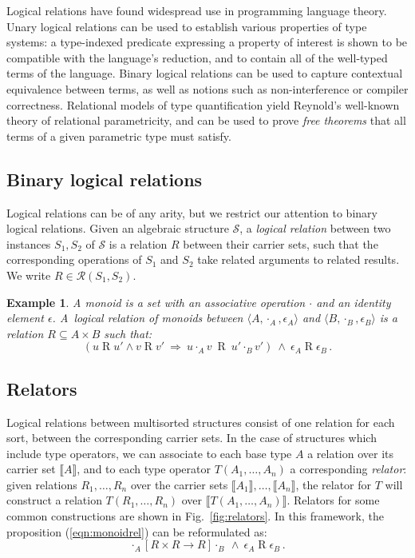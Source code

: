 \documentclass[draft,11pt]{report}
\newtheorem{example}{Example}
\newcommand{\ifr}[1]{\mathrel{[{#1}]}}
\begin{document}
Logical relations have found widespread use in programming language theory.
Unary logical relations can be used to establish
various properties of type systems:
a type-indexed predicate expressing a property of interest
is shown to be compatible with the language's reduction,
and to contain all of the well-typed terms of the language.
Binary logical relations can be used to capture
contextual equivalence between terms,
as well as notions such as non-interference or compiler correctness.
Relational models of type quantification yield
Reynold's well-known theory of relational parametricity,
and can be used to prove \emph{free theorems} that
all terms of a given parametric type must satisfy.

\subsection{Binary logical relations}

Logical relations can be of any arity,
but
we restrict our attention to
binary logical relations.
Given an algebraic structure $\mathcal{S}$,
a \emph{logical relation}
between two instances $S_1, S_2$ of $\mathcal{S}$
is a relation $R$
between their carrier sets,
such that the corresponding operations of $S_1$ and $S_2$
take related arguments to related results.
We write $R \in \mathcal{R}(S_1, S_2)$.

\begin{example}%
\label{ex:monoid}
A monoid is a set with
an associative operation $\cdot$ and
an identity element $\epsilon$.
A~\emph{logical relation of monoids} between
$\langle A, \cdot_A, \epsilon_A \rangle$ and
$\langle B, \cdot_B, \epsilon_B \rangle$
is a relation $R \subseteq A \times B$
such that:
\begin{equation}
\label{eqn:monoidrel}
(u \mathrel{R} u' \wedge v \mathrel{R} v' \: \Rightarrow \:
 u \cdot_A v \: \mathrel{R} \: u' \cdot_B v')
\: \wedge \:
\epsilon_A \mathrel{R} \epsilon_B \,.
\end{equation}
\end{example}

\subsection{Relators}

Logical relations between multisorted structures
consist of one relation for each sort,
between the corresponding carrier sets.
In the case of structures which include type operators,
we can associate to each base type $A$
a relation over its carrier set $\llbracket A \rrbracket$,
and to each type operator $T(A_1, \ldots, A_n)$
a corresponding \emph{relator}:
given relations $R_1, \ldots, R_n$ over
the carrier sets $\llbracket A_1 \rrbracket, \ldots, \llbracket A_n \rrbracket$,
the relator for $T$
will construct a relation $T(R_1, \ldots, R_n)$
over $\llbracket T(A_1, \ldots, A_n) \rrbracket$.
Relators for some common constructions are shown in Fig.~\ref{fig:relators}.
In this framework, the proposition (\ref{eqn:monoidrel}) can be reformulated as:
\[
  \cdot_A \ifr{R \times R \rightarrow R} \cdot_B
  \: \wedge \:
  \epsilon_A \mathrel{R} \epsilon_B \,.
\]
\end{document}
